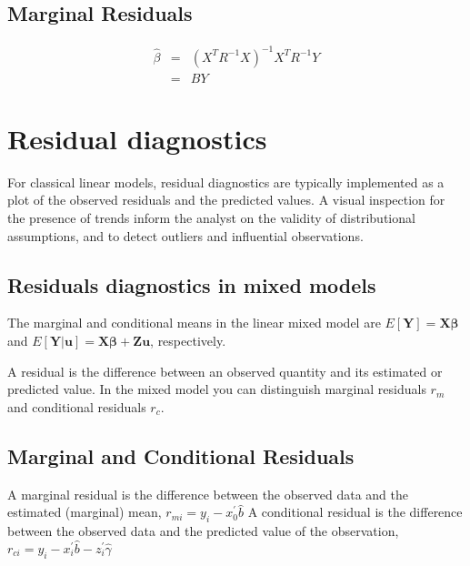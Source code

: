 \documentclass[Main.tex]{subfiles}
\begin{document}
\subsection{Marginal Residuals}
\begin{eqnarray}
\hat{\beta} &=& (X^{T}R^{-1}X)^{-1}X^{T}R^{-1}Y \nonumber \\
&=& BY \nonumber
\end{eqnarray}


\newpage
\section{Residual diagnostics} %
For classical linear models, residual diagnostics are typically implemented as a plot of the observed residuals and the predicted values. A visual inspection for the presence of trends inform the analyst on the validity of distributional assumptions, and to detect outliers and influential observations.




\subsection{Residuals diagnostics in mixed models}

The marginal and conditional means in the linear mixed model are
$E[\boldsymbol{Y}] = \boldsymbol{X}\boldsymbol{\beta}$ and
$E[\boldsymbol{Y|\boldsymbol{u}}] = \boldsymbol{X}\boldsymbol{\beta} + \boldsymbol{Z}\boldsymbol{u}$, respectively.

A residual is the difference between an observed quantity and its estimated or predicted value. In the mixed
model you can distinguish marginal residuals $r_m$ and conditional residuals $r_c$. 


\subsection{Marginal and Conditional Residuals}

A marginal residual is the difference between the observed data and the estimated (marginal) mean, $r_{mi} = y_i - x_0^{\prime} \hat{b}$
A conditional residual is the difference between the observed data and the predicted value of the observation,
$r_{ci} = y_i - x_i^{\prime} \hat{b} - z_i^{\prime} \hat{\gamma}$
\end{document}
